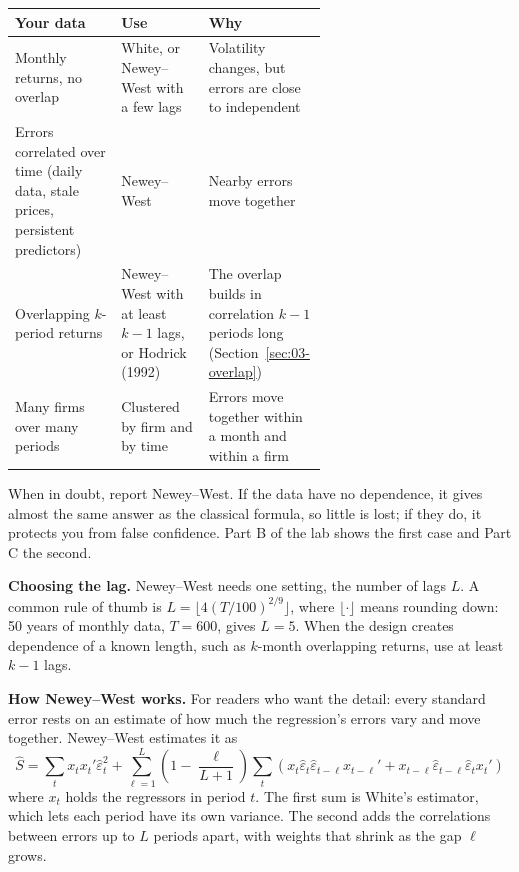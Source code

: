 \begin{center}
\small
\begin{tabularx}{0.95\linewidth}{@{}>{\raggedright\arraybackslash}p{0.34\linewidth}>{\raggedright\arraybackslash}p{0.28\linewidth}>{\raggedright\arraybackslash}X@{}}
\toprule
Your data & Use & Why \\
\midrule
Monthly returns, no overlap & White, or Newey--West with a few lags & Volatility changes, but errors are close to independent \\
Errors correlated over time (daily data, stale prices, persistent predictors) & Newey--West & Nearby errors move together \\
Overlapping $k$-period returns & Newey--West with at least $k-1$ lags, or Hodrick (1992) & The overlap builds in correlation $k-1$ periods long (Section~\ref{sec:03-overlap}) \\
Many firms over many periods & Clustered by firm and by time & Errors move together within a month and within a firm \\
\bottomrule
\end{tabularx}
\end{center}

When in doubt, report Newey--West. If the data have no dependence, it gives
almost the same answer as the classical formula, so little is lost; if they
do, it protects you from false confidence. Part B of the lab shows the first
case and Part C the second.

\textbf{Choosing the lag.} Newey--West needs one setting, the number of lags
$L$. A common rule of thumb is $L = \lfloor 4(T/100)^{2/9} \rfloor$, where
$\lfloor\cdot\rfloor$ means rounding down: 50 years of monthly data, $T = 600$,
gives $L = 5$. When the design creates dependence of a known length, such as
$k$-month overlapping returns, use at least $k - 1$ lags.

\textbf{How Newey--West works.} For readers who want the detail: every
standard error rests on an estimate of how much the regression's errors vary
and move together. Newey--West estimates it as
\begin{equation}
  \hat S = \sum_t x_t x_t' \hat\varepsilon_t^2 + \sum_{\ell=1}^{L} \left(1 - \frac{\ell}{L+1}\right) \sum_t \left(x_t \hat\varepsilon_t \hat\varepsilon_{t-\ell} x_{t-\ell}' + x_{t-\ell} \hat\varepsilon_{t-\ell} \hat\varepsilon_t x_t'\right)
  \label{eq:03-nw}
\end{equation}
where $x_t$ holds the regressors in period $t$. The first sum is White's
estimator, which lets each period have its own variance. The second adds the
correlations between errors up to $L$ periods apart, with weights that shrink
as the gap $\ell$ grows.

